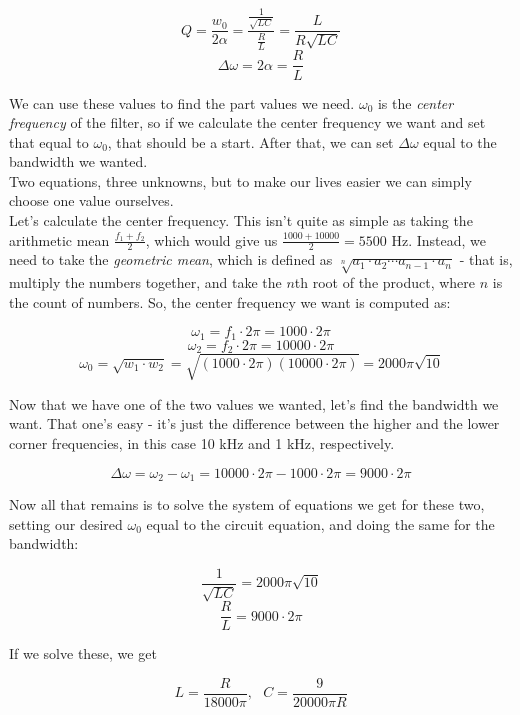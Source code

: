 \documentclass[12pt,a4paper]{report}
\begin{document}
\[ Q = \frac{w_0}{2\alpha} = \frac{ \frac{1}{\sqrt{LC}} }{ \frac{R}{L} } = \frac{L}{R\sqrt{LC}} \]
\[ \Delta\omega = 2 \alpha = \frac{R}{L} \]

We can use these values to find the part values we need. $\omega_0$ is the \emph{center frequency} of the filter, so if we calculate the center frequency we want and set that equal to $\omega_0$, that should be a start. After that, we can set $\Delta \omega$ equal to the bandwidth we wanted.\\
Two equations, three unknowns, but to make our lives easier we can simply choose one value ourselves.\\

Let's calculate the center frequency. This isn't quite as simple as taking the arithmetic mean $\displaystyle \frac{f_1 + f_2}{2}$, which would give us $\displaystyle \frac{1000 + 10000}{2} = 5500$ Hz. Instead, we need to take the \emph{geometric mean}, which is defined as $\sqrt[n]{a_1 \cdot a_2 \cdots a_{n-1} \cdot a_{n}}$ - that is, multiply the numbers together, and take the $n$th root of the product, where $n$ is the count of numbers. So, the center frequency we want is computed as:

\[ \omega_1 = f_1 \cdot 2\pi = 1000 \cdot 2 \pi \]
\[ \omega_2 = f_2 \cdot 2\pi = 10000 \cdot 2 \pi \]
\[ \omega_0 = \sqrt{w_1 \cdot w_2} = \sqrt{(1000 \cdot 2\pi)(10000 \cdot 2\pi)} = 2000 \pi \sqrt{10} \]

Now that we have one of the two values we wanted, let's find the bandwidth we want. That one's easy - it's just the difference between the higher and the lower corner frequencies, in this case 10 kHz and 1 kHz, respectively.

\[ \Delta \omega = \omega_2 - \omega_1 = 10000 \cdot 2\pi - 1000 \cdot 2\pi = 9000 \cdot 2\pi \]

Now all that remains is to solve the system of equations we get for these two, setting our desired $\omega_0$ equal to the circuit equation, and doing the same for the bandwidth:

\[ \frac{1}{\sqrt{LC}} = 2000\pi \sqrt{10} \]
\[ \frac{R}{L} = 9000 \cdot 2\pi \]

If we solve these, we get

\[ L = \frac{R}{18000 \pi},\text{ } C = \frac{9}{20000 \pi R} \]
\end{document}
